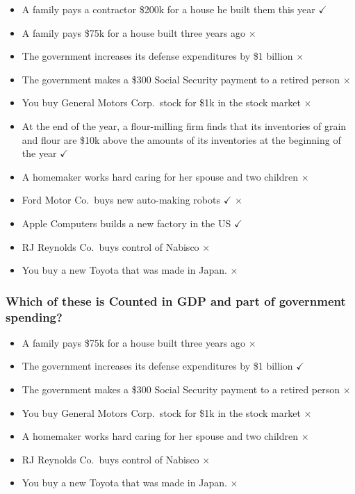 \documentclass[
  letterpaper,
  DIV=11,
  numbers=noendperiod]{scrartcl}
\providecommand{\tightlist}{%
  \setlength{\itemsep}{0pt}\setlength{\parskip}{0pt}}\usepackage{longtable,booktabs,array}
\begin{document}
\begin{itemize}
\tightlist
\item
  A family pays a contractor \$200k for a house he built them this year
  \(\checkmark\)
\item
  A family pays \$75k for a house built three years ago \(\times\)
\item
  The government increases its defense expenditures by \$1 billion
  \(\times\)
\item
  The government makes a \$300 Social Security payment to a retired
  person \(\times\)
\item
  You buy General Motors Corp.~stock for \$1k in the stock market
  \(\times\)
\item
  At the end of the year, a flour-milling firm finds that its
  inventories of grain and flour are \$10k above the amounts of its
  inventories at the beginning of the year \(\checkmark\)
\item
  A homemaker works hard caring for her spouse and two children
  \(\times\)
\item
  Ford Motor Co.~buys new auto-making robots \(\checkmark\) \(\times\)
\item
  Apple Computers builds a new factory in the US \(\checkmark\)
\item
  RJ Reynolds Co.~buys control of Nabisco \(\times\)
\item
  You buy a new Toyota that was made in Japan. \(\times\)
\end{itemize}

\hypertarget{which-of-these-is-counted-in-gdp-and-part-of-government-spending}{%
\subsubsection{Which of these is Counted in GDP and part of government
spending?}\label{which-of-these-is-counted-in-gdp-and-part-of-government-spending}}

\begin{itemize}
\tightlist
\item
  A family pays \$75k for a house built three years ago \(\times\)
\item
  The government increases its defense expenditures by \$1 billion
  \(\checkmark\)
\item
  The government makes a \$300 Social Security payment to a retired
  person \(\times\)
\item
  You buy General Motors Corp.~stock for \$1k in the stock market
  \(\times\)
\item
  A homemaker works hard caring for her spouse and two children
  \(\times\)
\item
  RJ Reynolds Co.~buys control of Nabisco \(\times\)
\item
  You buy a new Toyota that was made in Japan. \(\times\)
\end{itemize}
\end{document}
